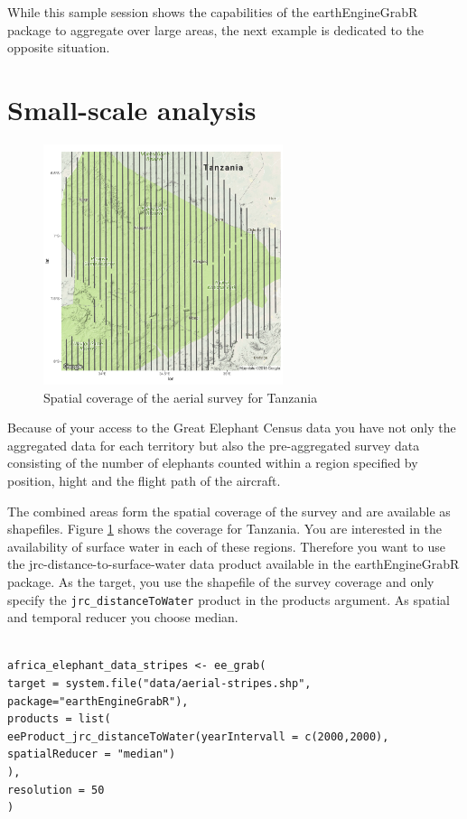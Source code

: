 While this sample session shows the capabilities of the earthEngineGrabR package to aggregate over large areas, the next example is dedicated to the opposite situation. 

\section{Small-scale analysis}

\begin{figure}
	\begin{center}
		\includegraphics[width=7cm]{images/stripes-cropped.pdf}
		\caption{Spatial coverage of the aerial survey for Tanzania}
		\label{stripes}
	\end{center}
\end{figure}


Because of your access to the Great Elephant Census data you have not only the aggregated data for each territory but also the pre-aggregated survey data consisting of the number of elephants counted within a region specified by position, hight and the flight path of the aircraft. 


The combined areas form the spatial coverage of the survey and are available as shapefiles.
Figure \ref{stripes} shows the coverage for Tanzania. You are interested in the availability of surface water in each of these regions. Therefore you want to use the jrc-distance-to-surface-water data product available in the earthEngineGrabR package. 
As the target, you use the shapefile of the survey coverage and only specify the \texttt{jrc\_distanceToWater} product in the products argument. As spatial and temporal reducer you choose median. 

\begin{lstlisting}

africa_elephant_data_stripes <- ee_grab(
target = system.file("data/aerial-stripes.shp", package="earthEngineGrabR"), 
products = list(
eeProduct_jrc_distanceToWater(yearIntervall = c(2000,2000), spatialReducer = "median")
),
resolution = 50
)
\end{lstlisting}



